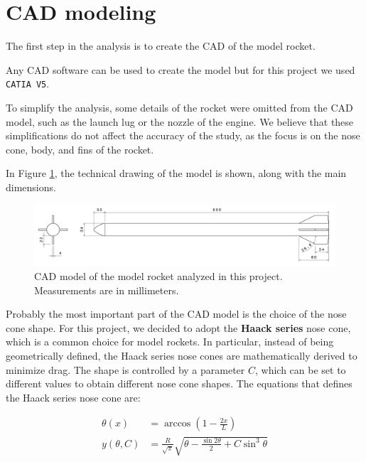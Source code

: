 \section{CAD modeling}
\label{sec:cad_modeling}

The first step in the analysis is to create the CAD of the model rocket.

Any CAD software can be used to create the model but for this project we used \texttt{CATIA V5}.

To simplify the analysis, some details of the rocket were omitted from the CAD model, such as the launch lug or the nozzle of the engine.
We believe that these simplifications do not affect the accuracy of the study, as the focus is on the nose cone, body, and fins of the rocket.

In Figure \ref{fig:CAD_model_drawing}, the technical drawing of the model is shown, along with the main dimensions.

\begin{figure}[H]
    \centering
    \includegraphics[width=\textwidth]{pdf/CAD_drawing.pdf}
    \caption{CAD model of the model rocket analyzed in this project. Measurements are in millimeters.}
    \label{fig:CAD_model_drawing}
\end{figure}

Probably the most important part of the CAD model is the choice of the nose cone shape.
For this project, we decided to adopt the \textbf{Haack series} nose cone, which is a common choice for model rockets.
In particular, instead of being geometrically defined, the Haack series nose cones are mathematically derived to minimize drag.
The shape is controlled by a parameter $C$, which can be set to different values to obtain different nose cone shapes.
The equations that defines the Haack series nose cone are:

\begin{align}
    \theta(x)    & = \arccos\left(1 - \frac{2x}{L}\right)                                            \\
    y(\theta, C) & = \frac{R}{\sqrt{\pi}} \sqrt{\theta - \frac{\sin{2\theta}}{2} + C \sin^3{\theta}} \\
\end{align}

